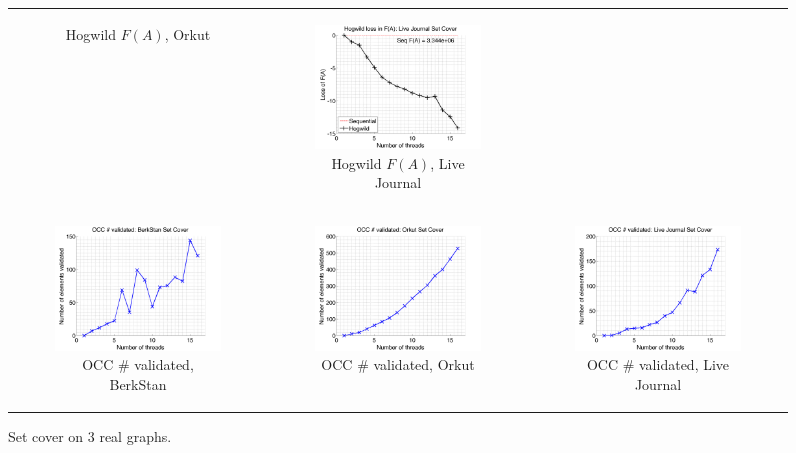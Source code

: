 \documentclass{article} %
\begin{document}
\begin{figure}[ht]
\begin{tabular}{ccc}
\begin{subfigure}[b]{0.31\textwidth}
			\caption{Hogwild $F(A)$, Orkut}
			\label{fig:diffFA_Hogwild_orkut_setcover}
	  \end{subfigure} &
	  \begin{subfigure}[b]{0.31\textwidth}
	  	\includegraphics[width=150pt]{images/diffFA_Hogwild_livejournal_setcover.png}
			\caption{Hogwild $F(A)$, Live Journal}
			\label{fig:diffFA_Hogwild_livejournal_setcover}
	  \end{subfigure} \\
	  \begin{subfigure}[b]{0.31\textwidth}
	  	\includegraphics[width=150pt]{images/validated_OCC_webberkstan_setcover.png}
			\caption{OCC \# validated, BerkStan}
			\label{fig:validated_OCC_webberkstan_setcover}
	  \end{subfigure} &
	  \begin{subfigure}[b]{0.31\textwidth}
	  	\includegraphics[width=150pt]{images/validated_OCC_orkut_setcover.png}
			\caption{OCC \# validated, Orkut}
			\label{fig:validated_OCC_orkut_setcover}
	  \end{subfigure} &
	  \begin{subfigure}[b]{0.31\textwidth}
	  	\includegraphics[width=150pt]{images/validated_OCC_livejournal_setcover.png}
			\caption{OCC \# validated, Live Journal}
			\label{fig:validated_OCC_livejournal_setcover}
	  \end{subfigure} \\
  \end{tabular}
  \caption{Set cover on 3 real graphs.}
\end{figure}
\end{document}
